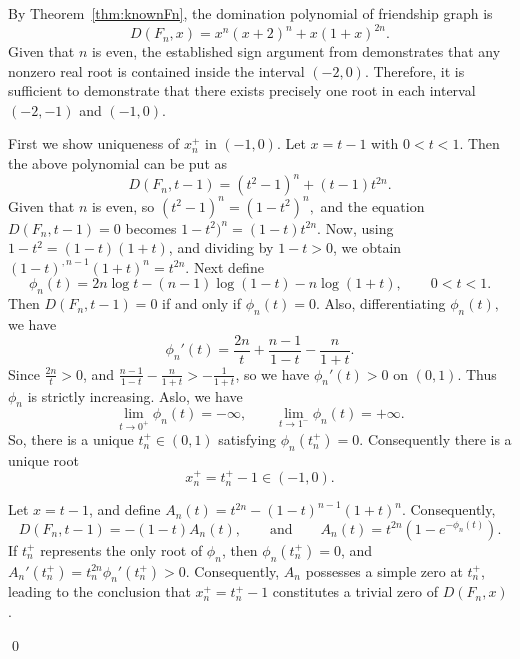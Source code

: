 \documentclass[12pt]{article}
\theoremstyle{definition}
\renewenvironment{proof}{{\noindent\bfseries Proof.}}{\qed}
\begin{document}
	\begin{proof}
		By Theorem~\ref{thm:knownFn}, the domination polynomial of friendship graph is
		$$
		D(F_n,x)=x^n(x+2)^n+x(1+x)^{2n}.
		$$
		Given that $n$ is even, the established sign argument from \cite{AlikhaniBrownJahari2016} demonstrates that any nonzero real root is contained inside the interval $(-2,0)$. Therefore, it is sufficient to demonstrate that there exists precisely one root in each interval $(-2,-1)$ and $(-1,0)$.
		
		\medskip
		First we show uniqueness of $x_n^+$ in $(-1,0)$. Let $x=t-1$ with $0<t<1.$ Then the above polynomial can be put as
		$$
		D(F_n,t-1)=(t^2-1)^n+(t-1)t^{2n}.
		$$
		Given that $n$ is even, so $ (t^2-1)^n=(1-t^2)^n, $ and the equation $D(F_n,t-1)=0$ becomes $ 1-t^2)^n=(1-t)t^{2n}.$
		Now, using $1-t^2=(1-t)(1+t)$, and dividing by $1-t>0$, we obtain
		$(1-t)^{,n-1}(1+t)^n=t^{2n}.$ Next define
		$$
		\phi_n(t)=2n\log t-(n-1)\log(1-t)-n\log(1+t), \qquad 0<t<1.
		$$
		Then $D(F_n,t-1)=0$ if and only if $\phi_n(t)=0$. Also, differentiating $\phi_n(t),$ we have
		$$
		\phi_n'(t)=\frac{2n}{t}+\frac{n-1}{1-t}-\frac{n}{1+t}.
		$$ 
		Since $\tfrac{2n}{t}>0$, and $\tfrac{n-1}{1-t}-\tfrac{n}{1+t}>-\tfrac{1}{1+t}$, so we have $\phi_n'(t)>0$ on $(0,1)$. Thus $\phi_n$ is strictly increasing. Aslo, we have
		$$
		\lim_{t\to 0^+}\phi_n(t)=-\infty, \qquad \lim_{t\to 1^-}\phi_n(t)=+\infty.
		$$
		So, there is a unique $t_n^+\in(0,1)$ satisfying $\phi_n(t_n^+)=0$. Consequently there is a unique root
		$$
		x_n^+=t_n^+-1\in(-1,0).
		$$
		
		Let \( x = t - 1 \), and define \( A_n(t) =t^{2n} - (1 - t)^{n-1}(1 + t)^n. \) Consequently, \[ D(F_n, t - 1) = -(1 - t)A_n(t), \qquad \text{and}\qquad  A_n(t) = t^{2n}(1 - e^{-\phi_n(t)}). \] 	If \( t_n^+ \) represents the only root of \( \phi_n \), then \( \phi_n(t_n^+) = 0 \), and  \( A_n'(t_n^+) = t_n^{2n}\phi_n'(t_n^+) > 0. \) Consequently, \( A_n \) possesses a simple zero at \( t_n^+ \), leading to the conclusion that \( x_n^+ = t_n^+ - 1 \) 	constitutes a trivial zero of \( D(F_n, x) \).
		

\end{proof}
\end{document}
